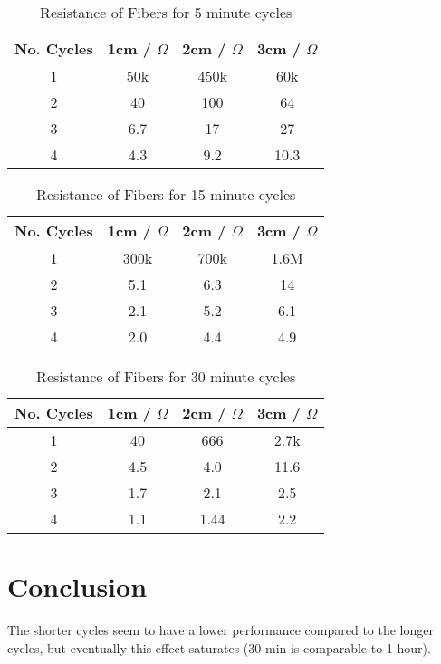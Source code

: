 \documentclass{article}
\begin{document}
\begin{table}[h!]
\centering
\begin{tabular}{ |c|c|c|c| } 
    \hline
    No. Cycles &  1cm / $\Omega$ & 2cm / $\Omega$ & 3cm / $\Omega$  \\
    \hline
    1 & 50k & 450k & 60k \\
    2 & 40 & 100 & 64\\
    3 & 6.7 & 17 & 27\\
    4 & 4.3 & 9.2 & 10.3\\
    \hline
\end{tabular}
 \caption{Resistance of Fibers for 5 minute cycles}
\label{table:4}
\end{table}

\begin{table}[h!]
\centering
\begin{tabular}{ |c|c|c|c| } 
    \hline
    No. Cycles &  1cm / $\Omega$ & 2cm / $\Omega$ & 3cm / $\Omega$  \\
    \hline
    1 & 300k & 700k & 1.6M \\
    2 & 5.1 & 6.3 & 14\\
    3 & 2.1 & 5.2 & 6.1\\
    4 & 2.0 & 4.4 & 4.9\\
    \hline
\end{tabular}
 \caption{Resistance of Fibers for 15 minute cycles}
\label{table:5}
\end{table}

\begin{table}[h!]
\centering
\begin{tabular}{ |c|c|c|c| } 
    \hline
    No. Cycles &  1cm / $\Omega$ & 2cm / $\Omega$ & 3cm / $\Omega$  \\
    \hline
    1 & 40 & 666 & 2.7k\\
    2 & 4.5 & 4.0 & 11.6\\
    3 & 1.7 & 2.1 & 2.5\\
    4 & 1.1 & 1.44 & 2.2\\
    \hline
\end{tabular}
\label{table:6}
\caption{Resistance of Fibers for 30 minute cycles}
\end{table}


\section{Conclusion}
The shorter cycles seem to have a lower performance compared to the longer cycles, but eventually this effect saturates (30 min is comparable to 1 hour).
\end{document}
